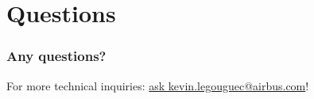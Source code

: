 \documentclass[english]{beamer}
\begin{document}
\section[Questions]{Questions}

\begin{frame}
  \frametitle{Any questions?}

  For more technical inquiries: \href{mailto:kevin.legouguec@airbus.com}{ask kevin.legouguec@airbus.com}!
\end{frame}
\end{document}
